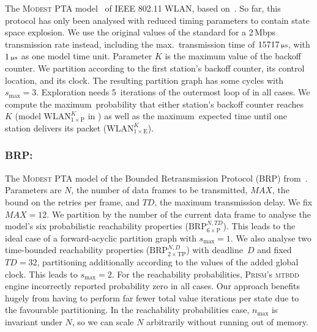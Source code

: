 \documentclass{llncs}
\newcommand{\modest}{\textsc{\mbox{Modest}}\xspace}
\newcommand{\sunit}[1]{\text{\begin{scriptsize}\,#1\end{scriptsize}}}
\newcommand{\prism}{\textsc{Prism}\xspace}
\begin{document}
The \modest PTA model~\cite{HH09} of IEEE 802.11 WLAN, based on~\cite{KNS02}.
So far, this protocol has only been analysed with reduced timing parameters to contain state space explosion.
We use the original values of the standard for a 2\,Mbps transmission rate instead, including the max.\ transmission time of $15717\sunit{$\upmu\text{s}$}$, with $1\sunit{$\upmu\text{s}$}$ as one model time unit.
Parameter $K$ is the maximum value of the backoff counter.
We partition according to the first station's backoff counter, its control location, and its clock.
The resulting partition graph has some cycles with $s_{\max} = 3$.
Exploration needs 5~iterations of the outermost loop of  in all cases.
We compute the maximum\ probability that either station's backoff counter reaches $K$ (model $\text{WLAN}_{1\times\text{P}}^{K}$ in ) as well as the maximum\ expected time until one station delivers its packet ($\text{WLAN}_{1\times\text{E}}^{K}$).
\iffalse
Under heading ``full matrix'', we report the disk space that would be needed for the sparse matrix-like representation of the entire state space in the random access format of \Cref{fig:SparseMatrixMemory} (``RA'') or in inverse-sequential format (``IS''), and the actual disk usage of the latter combined with compression (``$\text{IS}_\text{LZ4}$'').
We see that the inverse-sequential format reduces disk usage by $25\,\%$ and compression adds another $87\,\%$ reduction.
In the end, disk usage is reduced by a factor of around~10.
We observed a similar behaviour on the other models.
\fi


\subsubsection{BRP:}

The \modest PTA model of the Bounded Retransmission Protocol (BRP) from~\cite{HH09}.
Parameters are $N$, the number of data frames to be transmitted, $\mathit{MAX}$, the bound on the retries per frame, and $\mathit{TD}$, the maximum transmission delay.
We fix $\mathit{MAX} = 12$.
We partition by the number of the current data frame to analyse the model's six probabilistic reachability properties ($\text{BRP}_{6\times\text{P}}^{N\!,\mathit{T\!D}}$).
This leads to the ideal case of a forward-acyclic partition graph with $s_{\max} = 1$.
We also analyse two time-bounded reachability properties ($\text{BRP}_{2\times\text{TP}}^{N\!,D}$) with deadline~$D$ and fixed $\mathit{TD} = 32$, partitioning additionally according to the values of the added global clock.
This leads to $s_{\max}=2$.
For the reachability probabilities, \prism's \textsc{mtbdd} engine incorrectly reported probability zero in all cases.
Our approach benefits hugely from having to perform far fewer total value iterations per state due to the favourable partitioning.
In the reachability probabilities case, $n_{\max}$ is invariant under $N$, so we can scale $N$ arbitrarily without running out of memory.
\end{document}
